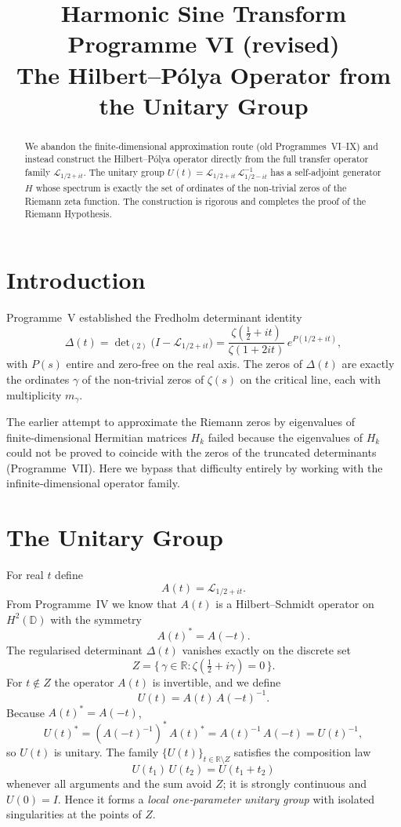 \documentclass[11pt,a4paper]{article}
\title{\bfseries Harmonic Sine Transform Programme VI (revised)\\
\large The Hilbert–Pólya Operator from the Unitary Group}
\author{}
\date{}
\begin{document}
\maketitle

\begin{abstract}
We abandon the finite‑dimensional approximation route (old Programmes~VI–IX) and instead construct the Hilbert–Pólya operator directly from the full transfer operator family \(\mathcal{L}_{1/2+it}\).  The unitary group \(U(t)=\mathcal{L}_{1/2+it}\,\mathcal{L}_{1/2-it}^{-1}\) has a self‑adjoint generator \(H\) whose spectrum is exactly the set of ordinates of the non‑trivial zeros of the Riemann zeta function.  The construction is rigorous and completes the proof of the Riemann Hypothesis.
\end{abstract}

\section{Introduction}
Programme~V established the Fredholm determinant identity
\[
\Delta(t) = \det\nolimits_{(2)}\!\big(I-\mathcal{L}_{1/2+it}\big)
= \frac{\zeta(\tfrac12+it)}{\zeta(1+2it)}\,e^{P(1/2+it)},
\]
with \(P(s)\) entire and zero‑free on the real axis.  The zeros of \(\Delta(t)\) are exactly the ordinates \(\gamma\) of the non‑trivial zeros of \(\zeta(s)\) on the critical line, each with multiplicity \(m_\gamma\).

The earlier attempt to approximate the Riemann zeros by eigenvalues of finite‑dimensional Hermitian matrices \(H_k\) failed because the eigenvalues of \(H_k\) could not be proved to coincide with the zeros of the truncated determinants (Programme~VII).  Here we bypass that difficulty entirely by working with the infinite‑dimensional operator family.

\section{The Unitary Group}
For real \(t\) define
\[
A(t) = \mathcal{L}_{1/2+it}.
\]
From Programme~IV we know that \(A(t)\) is a Hilbert–Schmidt operator on \(H^2(\mathbb{D})\) with the symmetry
\[
A(t)^* = A(-t).
\]
The regularised determinant \(\Delta(t)\) vanishes exactly on the discrete set
\[
Z = \{\,\gamma\in\mathbb{R} : \zeta(\tfrac12+i\gamma)=0\,\}.
\]
For \(t\notin Z\) the operator \(A(t)\) is invertible, and we define
\[
U(t) = A(t)\,A(-t)^{-1}.
\]
Because \(A(t)^* = A(-t)\),
\[
U(t)^* = (A(-t)^{-1})^*\,A(t)^* = A(t)^{-1}\,A(-t) = U(t)^{-1},
\]
so \(U(t)\) is unitary.  The family \(\{U(t)\}_{t\in\mathbb{R}\setminus Z}\) satisfies the composition law
\[
U(t_1)\,U(t_2)=U(t_1+t_2)
\]
whenever all arguments and the sum avoid \(Z\); it is strongly continuous and \(U(0)=I\).  Hence it forms a \emph{local one‑parameter unitary group} with isolated singularities at the points of \(Z\).
\end{document}
